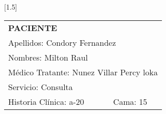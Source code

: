 \documentclass[10pt,a4paper]{article}
\begin{document}
 
\begin{minipage}{10cm}
\end{minipage}
\hfill
\begin{minipage}{10cm}
\begin{flushleft}
\scalebox{1.4}[1.5]{
\begin{tabular}{|p{3cm}p{2.3cm}|}
\hline 
\multicolumn{2}{|l|}{\scriptsize{\textbf{PACIENTE}}}\\
\multicolumn{2}{|p{5.3cm}|}{\scriptsize{Apellidos: Condory Fernandez}}\\ 
\multicolumn{2}{|p{5.3cm}|}{\scriptsize{Nombres: Milton Raul}}\\ 
\multicolumn{2}{|p{5.3cm}|}{\scriptsize{M\'edico Tratante: Nunez Villar Percy loka}}\\ 
\hline 
\multicolumn{2}{|p{5.3cm}|}{\scriptsize{Servicio: Consulta}}\\
\hline 
\scriptsize{Historia Cl\'inica: a-20}&\scriptsize{Cama: 15} \\ 
\hline 
\end{tabular}}
\end{flushleft}
\end{minipage}
\end{document}
